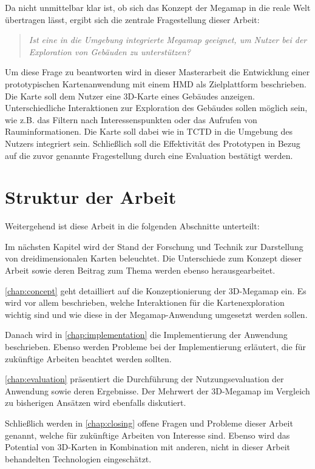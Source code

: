 Da nicht unmittelbar klar ist, ob sich das Konzept der Megamap in die reale Welt übertragen lässt, ergibt sich die zentrale Fragestellung dieser Arbeit:
\begin{quote}
\itshape
Ist eine in die Umgebung integrierte Megamap geeignet, um Nutzer bei der Exploration von Gebäuden zu unterstützen?
\end{quote}
Um diese Frage zu beantworten wird in dieser Masterarbeit die Entwicklung einer prototypischen Kartenanwendung mit einem HMD als Zielplattform beschrieben.
Die Karte soll dem Nutzer eine 3D-Karte eines Gebäudes anzeigen.
Unterschiedliche Interaktionen zur Exploration des Gebäudes sollen möglich sein, wie z.B. das Filtern nach Interessenspunkten oder das Aufrufen von Rauminformationen.
Die Karte soll dabei wie in TCTD in die Umgebung des Nutzers integriert sein.
Schließlich soll die Effektivität des Prototypen in Bezug auf die zuvor genannte Fragestellung durch eine Evaluation bestätigt werden.

\section{Struktur der Arbeit}
\label{sec:struktur}
Weitergehend ist diese Arbeit in die folgenden Abschnitte unterteilt:

Im nächsten Kapitel wird der Stand der Forschung und Technik zur Darstellung von dreidimensionalen Karten beleuchtet.
Die Unterschiede zum Konzept dieser Arbeit sowie deren Beitrag zum Thema werden ebenso herausgearbeitet.

\autoref{chap:concept} geht detailliert auf die Konzeptionierung der 3D-Megamap ein.
Es wird vor allem beschrieben, welche Interaktionen für die Kartenexploration wichtig sind und wie diese in der Megamap-Anwendung umgesetzt werden sollen.

Danach wird in \autoref{chap:implementation} die Implementierung der Anwendung beschrieben.
Ebenso werden Probleme bei der Implementierung erläutert, die für zukünftige Arbeiten beachtet werden sollten.

\autoref{chap:evaluation} präsentiert die Durchführung der Nutzungsevaluation der Anwendung sowie deren Ergebnisse.
Der Mehrwert der 3D-Megamap im Vergleich zu bisherigen Ansätzen wird ebenfalls diskutiert.

Schließlich werden in \autoref{chap:closing} offene Fragen und Probleme dieser Arbeit genannt, welche für zukünftige Arbeiten von Interesse sind.
Ebenso wird das Potential von 3D-Karten in Kombination mit anderen, nicht in dieser Arbeit behandelten Technologien eingeschätzt.
%
\cleardoublepage
